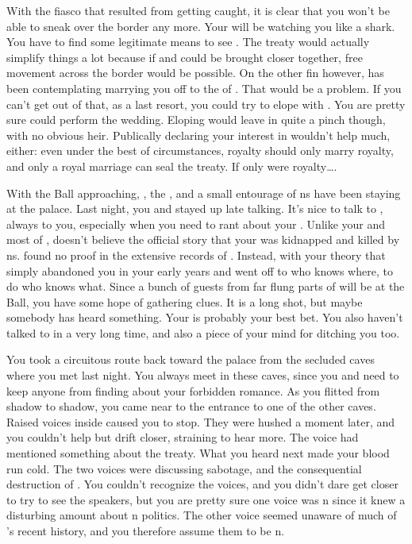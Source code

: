 \documentclass[char]{NeptuneBall}
\begin{document}
With the fiasco that resulted from getting caught, it is clear that you won't be able to sneak over the border any more. Your \cKing{\parent} will be watching you like a shark. You have to find some legitimate means to see \cDiplomat{}. The treaty would actually simplify things a lot because if \pPacifica{} and \pAtlantis{} could be brought closer together, free movement across the border would be possible. On the other fin however, \cKing{\King} \cKing{} has been contemplating marrying you off to the \cPrince{\prince} of \pPacifica{}. That would be a problem.  If you can't get out of that, as a last resort, you could try to elope with \cDiplomat{}. You are pretty sure \cPriest{} could perform the wedding. Eloping would leave \pAtlantis{} in quite a pinch though, with no obvious heir. Publically declaring your interest in \cDiplomat{} wouldn't help much, either: even under the best of circumstances, royalty should only marry royalty, and only a royal marriage can seal the treaty. If only \cDiplomat{} were royalty\ldots.

With the \cExExKing{} Ball approaching, \cDiplomat{}, the \cPrince{\prince}, and a small entourage of \pPacifica{}ns have been staying at the palace. Last night, you and \cDiplomat{} stayed up late talking. It's nice to talk to \cDiplomat{\them}, \cDiplomat{\they} always  to you, especially when you need to rant about your \cQueen{\parent}. Unlike your \cKing{\parent} and most of \pAtlantis{}, \cDiplomat{} doesn't believe the official story that your \cQueen{\parent} was kidnapped and killed by \pPacifica{}ns. \cDiplomat{\They} \cDiplomat{\have} found no proof in the extensive records of \pPacifica{}. Instead, \cDiplomat{\they} with your theory that \cQueen{\King} \cQueen{} simply abandoned you in your early years and went off to who knows where, to do who knows what.  Since a bunch of guests from far flung parts of \pAtlantis{} will be at the Ball, you have some hope of gathering clues. It is a long shot, but maybe somebody has heard something. Your \cAriel{\sibling} \cAriel{} is probably your best bet. You also haven't talked to \cAriel{} in a very long time, and \cAriel{\they} also  a piece of your mind for ditching you too.

You took a circuitous route back toward the palace from the secluded caves where you met \cDiplomat{} last night. You always meet in these caves, since you and \cDiplomat{} need to keep anyone from finding about your forbidden romance. As you flitted from shadow to shadow, you came near to the entrance to one of the other caves. Raised voices inside caused you to stop. They were hushed a moment later, and you couldn't help but drift closer, straining to hear more.  The voice had mentioned something about the treaty. What you heard next made your blood run cold. The two voices were discussing sabotage, and the consequential destruction of \pAtlantis{}. You couldn't recognize the voices, and you didn't dare get closer to try to see the speakers, but you are pretty sure one voice was \pAtlantis{}n since it knew a disturbing amount about \pAtlantis{}n politics. The other voice seemed unaware of much of \pAtlantis{}'s recent history, and you therefore assume them to be \pPacifica{}n.
\end{document}

